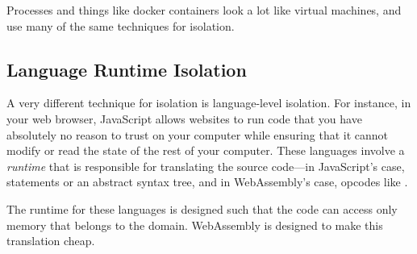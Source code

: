 Processes and things like docker containers look a lot like virtual machines, and use many of the same techniques for isolation.

\subsection{Language Runtime Isolation}
A very different technique for isolation is language-level isolation. For instance, in your web browser, JavaScript allows websites to run code that you have absolutely no reason to trust on your computer while ensuring that it cannot modify or read the state of the rest of your computer. These languages involve a \emph{runtime} that is responsible for translating the source code---in JavaScript's case, statements or an abstract syntax tree, and in WebAssembly's case, opcodes like .

The runtime for these languages is designed such that the code can access only memory that belongs to the domain. WebAssembly is designed to make this translation cheap.
